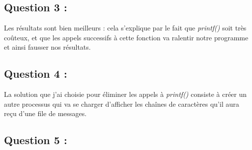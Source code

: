 \documentclass{article}
\begin{document}
\subsection*{Question 3 :}

Les résultats sont bien meilleurs : cela s'explique par le fait que \textit{printf()} soit très coûteux, et que les appels successifs à cette fonction va ralentir notre programme et ainsi fausser nos résultats.

\subsection*{Question 4 :}

La solution que j'ai choisie pour éliminer les appels à \textit{printf()} consiste à créer un autre processus qui va se charger d'afficher les chaînes de caractères qu'il aura reçu d'une file de messages.

\subsection*{Question 5 :}



\end{document}
